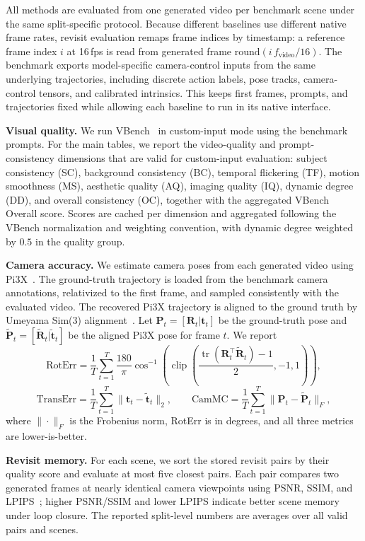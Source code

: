 All methods are evaluated from one generated video per benchmark scene under the same split-specific protocol.
Because different baselines use different native frame rates, revisit evaluation remaps frame indices by timestamp: a reference frame index $i$ at 16\,fps is read from generated frame $\mathrm{round}(i\,f_{\mathrm{video}}/16)$.
The benchmark exports model-specific camera-control inputs from the same underlying trajectories, including discrete action labels, pose tracks, camera-control tensors, and calibrated intrinsics.
This keeps first frames, prompts, and trajectories fixed while allowing each baseline to run in its native interface.

\noindent\textbf{Visual quality.}
We run VBench~\citep{vbench} in custom-input mode using the benchmark prompts.
For the main tables, we report the video-quality and prompt-consistency dimensions that are valid for custom-input evaluation: subject consistency (SC), background consistency (BC), temporal flickering (TF), motion smoothness (MS), aesthetic quality (AQ), imaging quality (IQ), dynamic degree (DD), and overall consistency (OC), together with the aggregated VBench Overall score.
Scores are cached per dimension and aggregated following the VBench normalization and weighting convention, with dynamic degree weighted by $0.5$ in the quality group.

\noindent\textbf{Camera accuracy.}
We estimate camera poses from each generated video using Pi3X~\citep{pi3x}.
The ground-truth trajectory is loaded from the benchmark camera annotations, relativized to the first frame, and sampled consistently with the evaluated video.
The recovered Pi3X trajectory is aligned to the ground truth by Umeyama Sim(3) alignment~\citep{umeyama}.
Let $\mathbf{P}_t=[\mathbf{R}_t|\mathbf{t}_t]$ be the ground-truth pose and $\widetilde{\mathbf{P}}_t=[\widetilde{\mathbf{R}}_t|\widetilde{\mathbf{t}}_t]$ be the aligned Pi3X pose for frame $t$.
We report
\[
\mathrm{RotErr}=\frac{1}{T}\sum_{t=1}^{T}\frac{180}{\pi}
\cos^{-1}\!\left(\operatorname{clip}\!\left(\frac{\operatorname{tr}(\mathbf{R}_t^\top\widetilde{\mathbf{R}}_t)-1}{2},-1,1\right)\right),
\]
\[
\mathrm{TransErr}=\frac{1}{T}\sum_{t=1}^{T}\|\mathbf{t}_t-\widetilde{\mathbf{t}}_t\|_2,\qquad
\mathrm{CamMC}=\frac{1}{T}\sum_{t=1}^{T}\|\mathbf{P}_t-\widetilde{\mathbf{P}}_t\|_F,
\]
where $\|\cdot\|_F$ is the Frobenius norm, RotErr is in degrees, and all three metrics are lower-is-better.

\noindent\textbf{Revisit memory.}
For each scene, we sort the stored revisit pairs by their quality score and evaluate at most five closest pairs.
Each pair compares two generated frames at nearly identical camera viewpoints using PSNR, SSIM, and LPIPS~\citep{lpips}; higher PSNR/SSIM and lower LPIPS indicate better scene memory under loop closure.
The reported split-level numbers are averages over all valid pairs and scenes.

